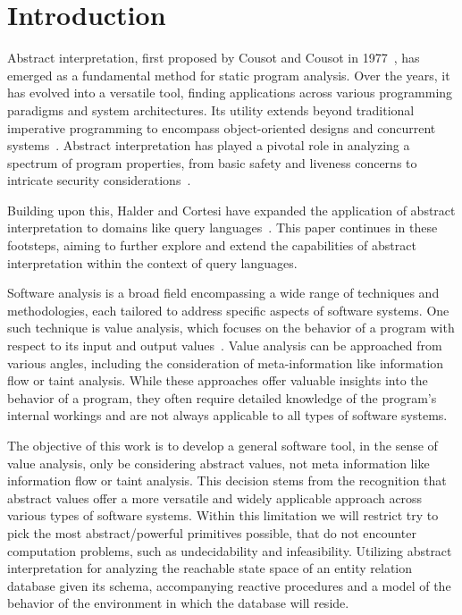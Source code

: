 
\section{Introduction}\label{sec:introduction}
Abstract interpretation, first proposed by Cousot and Cousot in 1977~\cite{cousot_abstract_1977}, has emerged as a fundamental method for static program analysis.
Over the years, it has evolved into a versatile tool, finding applications across various programming paradigms and system architectures.
Its utility extends beyond traditional imperative programming to encompass object-oriented designs and concurrent systems~\cite{gustafsson_analyzing_2013, mine_static_2023}.
Abstract interpretation has played a pivotal role in analyzing a spectrum of program properties, from basic safety and liveness concerns to intricate security considerations~\cite{mastroeni_abstract_2011}.

Building upon this, Halder and Cortesi have expanded the application of abstract interpretation to domains like query languages~\cite{halder_abstract_2012}.
This paper continues in these footsteps, aiming to further explore and extend the capabilities of abstract interpretation within the context of query languages.


Software analysis is a broad field encompassing a wide range of techniques and methodologies, each tailored to address specific aspects of software systems.
One such technique is value analysis, which focuses on the behavior of a program with respect to its input and output values~\cite{jackson_software_2000}.
Value analysis can be approached from various angles, including the consideration of meta-information like information flow or taint analysis.
While these approaches offer valuable insights into the behavior of a program, they often require detailed knowledge of the program's internal workings and are not always applicable to all types of software systems.

The objective of this work is to develop a general software tool, in the sense of value analysis, only be considering abstract values, not meta information like information flow or taint analysis.
This decision stems from the recognition that abstract values offer a more versatile and widely applicable approach across various types of software systems.
Within this limitation we will restrict try to pick the most abstract/powerful primitives possible, that do not encounter computation problems, such as undecidability and infeasibility.
Utilizing abstract interpretation for analyzing the reachable state space of an entity relation database given its schema, accompanying reactive procedures and a model of the behavior of the environment in which the database will reside.

